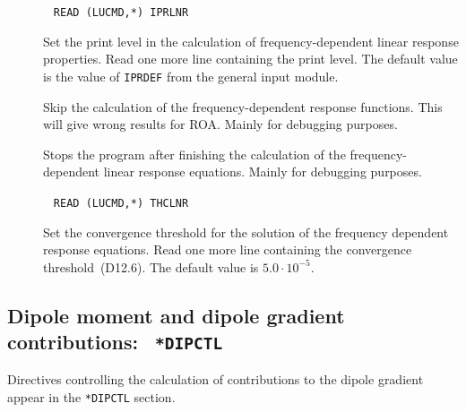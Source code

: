 \begin{description}
\item[]\verb| |\newline
\verb|READ (LUCMD,*) IPRLNR|

Set the print level in the calculation of frequency-dependent linear
response properties. Read one more line containing the print level.
The default value is the value of \verb|IPRDEF| from the general input
module. 

\item[] Skip the calculation of the frequency-dependent
response functions. This will give wrong results for ROA. Mainly for
debugging purposes.

\item[] Stops the program after finishing the
calculation of the frequency-dependent linear response equations. Mainly
for debugging purposes. 

\item[]\verb| |\newline
\verb|READ (LUCMD,*) THCLNR|

Set the convergence threshold for the solution
of the frequency dependent response equations. Read one more line
containing the convergence threshold~(D12.6). The default value is
$5.0\cdot10^{-5}$.
\end{description}

\subsection{Dipole moment and dipole gradient contributions: {\tt
*DIPCTL}}\label{sec:dipctl} 

Directives controlling the calculation of contributions to the
dipole gradient appear in the \verb|*DIPCTL| section.

